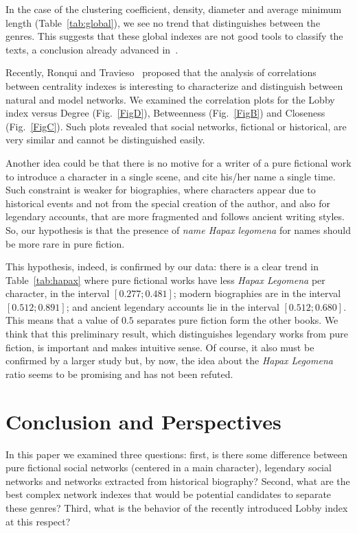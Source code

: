 \documentclass[review]{elsarticle}
\begin{document}
In the case of the clustering coefficient, density, diameter
and average minimum length (Table~\ref{tab:global}), we see no
trend that distinguishes between the genres. This
suggests that these global indexes are not good tools to classify
the texts, a conclusion already advanced
in~\cite{alberich2002marvel,gleiser2007become}.

Recently, Ronqui and Travieso~\cite{ronqui2015analyzing} proposed that
the analysis of correlations between centrality indexes is interesting
to characterize and distinguish between natural and model networks.
We examined the correlation plots for the Lobby index versus 
Degree (Fig.~\ref{FigD}), Betweenness (Fig.~\ref{FigB}) 
and Closeness (Fig.~\ref{FigC}). Such plots revealed that social
networks, fictional or historical, are very similar and cannot
be distinguished easily.

Another idea could be that there is no motive for a writer of a 
pure fictional work to introduce a 
character in a single scene, and cite his/her name a single time.
Such constraint is weaker for biographies, where characters appear
due to historical events and not from the special creation of 
the author, and also for legendary accounts, that are more fragmented
and follows ancient writing styles. So, our hypothesis is that 
the presence of \emph{name Hapax legomena} for names should be 
more rare in pure fiction. 

This hypothesis, indeed, is confirmed by our data: there is a clear 
trend in Table~\ref{tab:hapax} where pure fictional works have less
\emph{Hapax Legomena} per character, in the interval $[0.277; 0.481]$;
modern biographies are in the interval $[0.512;0.891]$; 
and ancient legendary accounts lie in the interval $[0.512;0.680]$.
This means that a value of $0.5$ separates pure fiction form the
other books. We think that this preliminary result, which distinguishes 
legendary works from pure fiction, is important and 
makes intuitive sense. Of course, it also must be confirmed 
by a larger study but, by now, the idea about the \emph{Hapax Legomena}
ratio seems to be promising and has not been refuted.

\section{Conclusion and Perspectives}

In this paper we examined  three questions:  first, is there
some difference  between  pure  fictional  social  networks
(centered in a main character), legendary social networks
and  networks  extracted from  historical  biography?
Second, what are the best complex network indexes that would be potential
candidates to separate these genres?  Third,  what  is the
behavior of the  recently introduced Lobby index at this respect?
\end{document}
